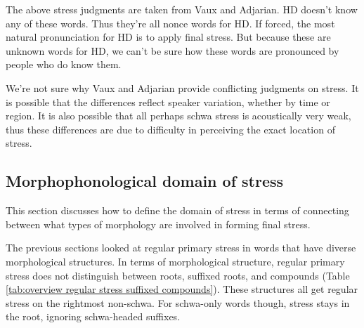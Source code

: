 The above stress judgments are taken from Vaux and Adjarian. HD doesn't know any of these words. Thus they're all nonce words for HD. If forced, the most natural pronunciation for HD is to apply final stress. But because these are unknown words for HD, we can't be sure how these words are pronounced by people who do know them. 

We're not sure why Vaux and Adjarian provide conflicting judgments on stress. It is possible that the differences reflect speaker variation, whether by time or region. It is also possible that all perhaps schwa stress is acoustically very weak, thus these differences are due to difficulty in perceiving the exact location of stress. 

\subsection{Morphophonological domain of stress}\label{section:stress:regular:domain}
This section discusses how to define the domain of stress in terms of connecting between what types of morphology are involved in forming final stress.  


The previous sections looked at regular primary stress in words that have diverse morphological structures. In terms of morphological structure, regular primary stress does not distinguish between roots, suffixed roots, and compounds (Table \ref{tab:overview regular stress suffixed compounds}). These structures all get regular  stress on the rightmost non-schwa. For schwa-only words though, stress stays in the root, ignoring schwa-headed suffixes. 

